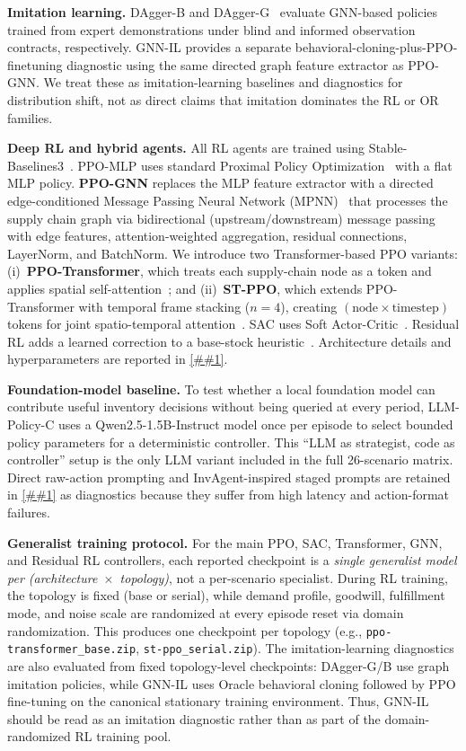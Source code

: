 \documentclass[10pt,a4paper]{article}
\providecommand{\Cref}[1]{\ref{##1}}
\begin{document}
\textbf{Imitation learning.}
DAgger-B and DAgger-G~\citep{ross2011} evaluate GNN-based policies
trained from expert demonstrations under blind and informed observation
contracts, respectively. GNN-IL provides a separate
behavioral-cloning-plus-PPO-finetuning diagnostic using the same
directed graph feature extractor as PPO-GNN. We treat these as
imitation-learning baselines and diagnostics for distribution shift,
not as direct claims that imitation dominates the RL or OR families.

\textbf{Deep RL and hybrid agents.}
All RL agents are trained using Stable-Baselines3~\citep{raffin2021}.
PPO-MLP uses standard Proximal Policy Optimization~\citep{schulman2017}
with a flat MLP policy.
\textbf{PPO-GNN} replaces the MLP feature extractor with a directed
edge-conditioned Message Passing Neural Network
(MPNN)~\citep{gilmer2017,velickovic2018} that processes
the supply chain graph via bidirectional (upstream/downstream)
message passing with edge features, attention-weighted aggregation,
residual connections, LayerNorm, and BatchNorm.
We introduce two Transformer-based PPO variants:
(i)~\textbf{PPO-Transformer}, which treats each supply-chain node as a token
and applies spatial self-attention~\citep{vaswani2017}; and
(ii)~\textbf{ST-PPO}, which extends PPO-Transformer with temporal frame
stacking ($n{=}4$), creating $(\text{node} \times \text{timestep})$ tokens
for joint spatio-temporal attention~\citep{parisotto2020}.
SAC uses Soft Actor-Critic~\citep{haarnoja2018}. Residual RL adds a learned
correction to a base-stock heuristic~\citep{silver2019}.
Architecture details and hyperparameters are reported in
\Cref{sec:appendix_hyperparams}.

\textbf{Foundation-model baseline.}
To test whether a local foundation model can contribute useful
inventory decisions without being queried at every period, LLM-Policy-C
uses a Qwen2.5-1.5B-Instruct model once per episode to select bounded
policy parameters for a deterministic controller. This ``LLM as
strategist, code as controller'' setup is the only LLM variant included
in the full 26-scenario matrix. Direct raw-action prompting and
InvAgent-inspired staged prompts are retained in
\Cref{sec:appendix_llm} as diagnostics because they suffer from high
latency and action-format failures.

\textbf{Generalist training protocol.}
For the main PPO, SAC, Transformer, GNN, and Residual RL controllers,
each reported checkpoint is a \emph{single generalist model per
(architecture~$\times$~topology)}, not a per-scenario specialist.
During RL training, the topology is fixed (base or serial), while
demand profile, goodwill, fulfillment mode, and noise scale are
randomized at every episode reset via domain randomization. This
produces one checkpoint per topology (e.g.,
\texttt{ppo-transformer\_base.zip}, \texttt{st-ppo\_serial.zip}).
The imitation-learning diagnostics are also evaluated from fixed
topology-level checkpoints: DAgger-G/B use graph imitation policies,
while GNN-IL uses Oracle behavioral cloning followed by PPO fine-tuning
on the canonical stationary training environment. Thus, GNN-IL should be
read as an imitation diagnostic rather than as part of the
domain-randomized RL training pool.
\end{document}
